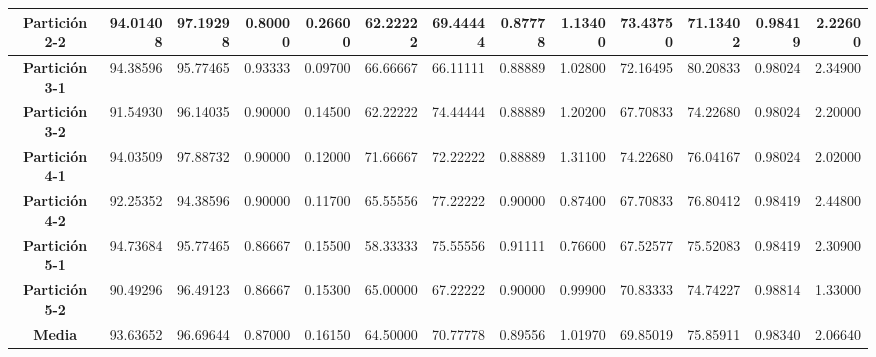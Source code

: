 \documentclass[a4paper,11pt]{article}
\begin{document}
\begin{table}[H]
\begin{adjustbox}{width=1.1\textwidth}
\begin{tabular}{|c|r|r|r|r|r|r|r|r|r|r|r|r|}
    \textbf{Partición 2-2} & 94.01408 & 97.19298 & 0.80000 & 0.26600 & 62.22222 & 69.44444 & 0.87778 & 1.13400 & 73.43750 & 71.13402 & 0.98419 & 2.22600 \\ \hline
    \textbf{Partición 3-1} & 94.38596 & 95.77465 & 0.93333 & 0.09700 & 66.66667 & 66.11111 & 0.88889 & 1.02800 & 72.16495 & 80.20833 & 0.98024 & 2.34900 \\ \hline
    \textbf{Partición 3-2} & 91.54930 & 96.14035 & 0.90000 & 0.14500 & 62.22222 & 74.44444 & 0.88889 & 1.20200 & 67.70833 & 74.22680 & 0.98024 & 2.20000 \\ \hline
    \textbf{Partición 4-1} & 94.03509 & 97.88732 & 0.90000 & 0.12000 & 71.66667 & 72.22222 & 0.88889 & 1.31100 & 74.22680 & 76.04167 & 0.98024 & 2.02000 \\ \hline
    \textbf{Partición 4-2} & 92.25352 & 94.38596 & 0.90000 & 0.11700 & 65.55556 & 77.22222 & 0.90000 & 0.87400 & 67.70833 & 76.80412 & 0.98419 & 2.44800 \\ \hline
    \textbf{Partición 5-1} & 94.73684 & 95.77465 & 0.86667 & 0.15500 & 58.33333 & 75.55556 & 0.91111 & 0.76600 & 67.52577 & 75.52083 & 0.98419 & 2.30900 \\ \hline
    \textbf{Partición 5-2} & 90.49296 & 96.49123 & 0.86667 & 0.15300 & 65.00000 & 67.22222 & 0.90000 & 0.99900 & 70.83333 & 74.74227 & 0.98814 & 1.33000 \\ \hline
    \textbf{Media} & 93.63652 & 96.69644 & 0.87000 & 0.16150 & 64.50000 & 70.77778 & 0.89556 & 1.01970 & 69.85019 & 75.85911 & 0.98340 & 2.06640 \\ \hline
    \end{tabular}
    \end{adjustbox}
    \label{SFS}
  \end{table}
 
\end{document}
